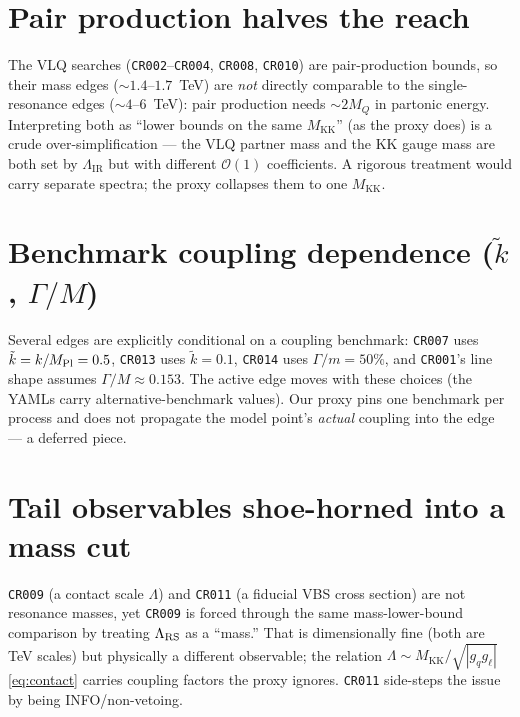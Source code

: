 \documentclass[11pt]{article}
\newcommand{\MKK}{M_{\mathrm{KK}}}
\newcommand{\LIR}{\Lambda_{\mathrm{IR}}}
\newcommand{\code}[1]{\texttt{#1}}
\theoremstyle{definition}
\begin{document}
\section{Pair production halves the reach}
The VLQ searches (\code{CR002}--\code{CR004}, \code{CR008}, \code{CR010}) are
pair-production bounds, so their mass edges ($\sim 1.4$--$1.7$~TeV) are
\emph{not} directly comparable to the single-resonance edges ($\sim 4$--$6$~TeV):
pair production needs $\sim 2 M_Q$ in partonic energy. Interpreting both as
``lower bounds on the same $\MKK$'' (as the proxy does) is a crude
over-simplification --- the VLQ partner mass and the KK gauge mass are both set
by $\LIR$ but with different $\mathcal{O}(1)$ coefficients. A rigorous treatment
would carry separate spectra; the proxy collapses them to one $\MKK$.

\section{Benchmark coupling dependence ($\tilde k$, $\Gamma/M$)}
Several edges are explicitly conditional on a coupling benchmark: \code{CR007}
uses $\tilde k = k/M_{\rm Pl} = 0.5$, \code{CR013} uses $\tilde k = 0.1$,
\code{CR014} uses $\Gamma/m = 50\%$, and \code{CR001}'s line shape assumes
$\Gamma/M \approx 0.153$. The active edge moves with these choices (the YAMLs
carry alternative-benchmark values). Our proxy pins one benchmark per process and
does not propagate the model point's \emph{actual} coupling into the edge --- a
deferred piece.

\section{Tail observables shoe-horned into a mass cut}
\code{CR009} (a contact scale $\Lambda$) and \code{CR011} (a fiducial VBS cross
section) are not resonance masses, yet \code{CR009} is forced through the same
mass-lower-bound comparison by treating $\Lambda_{\rm RS}$ as a ``mass.'' That is
dimensionally fine (both are TeV scales) but physically a different observable;
the relation $\Lambda \sim \MKK/\sqrt{|g_q g_\ell|}$ \eqref{eq:contact} carries
coupling factors the proxy ignores. \code{CR011} side-steps the issue by being
INFO/non-vetoing.
\end{document}
